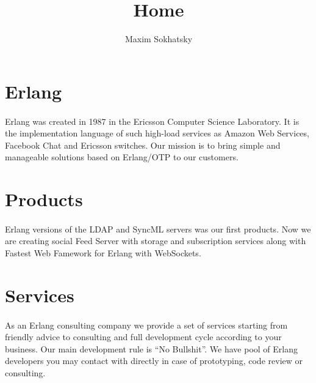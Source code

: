 \documentclass[11pt]{article}
\begin{document}
\title{Home}
\author{Maxim Sokhatsky}


\section*{Erlang}
\paragraph{}
Erlang was created in 1987 in the Ericsson Computer Science Laboratory.
It is the implementation language of such high-load services as Amazon Web Services,
Facebook Chat and Ericsson switches.
Our mission is to bring simple and manageable solutions based on Erlang/OTP to our customers.

\section*{Products}
\paragraph{}
Erlang versions of the LDAP and SyncML servers was our first products. Now we are
creating social Feed Server with storage and subscription services along with
Fastest Web Famework for Erlang with WebSockets.

\section*{Services}
\paragraph{}
As an Erlang consulting company we provide a set of services starting from friendly advice to
consulting and full development cycle according to your business.
Our main development rule is ``No Bullshit''.
We have pool of Erlang developers you may contact with directly in case of
prototyping, code review or consulting.
\end{document}
